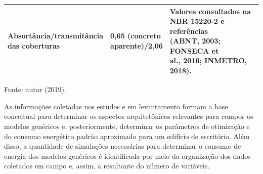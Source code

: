 \begin{table}[ht]
\begin{tabular*}{\columnwidth}{@{\extracolsep{\fill}}lll}
    \makecell[l]{Absortância/transmitância \\das coberturas}       & \makecell[l]{0,65 (concreto \\aparente)/2,06}                                         & \makecell[l]{Valores consultados na \\NBR 15220-2 e referências \\(ABNT, 2003; FONSECA et \\al., 2016; INMETRO, 2018).}                                                 \\ \hline
    \end{tabular*}
    \begin{flushleft}
        \par \small Fonte: autor (2019).
    \end{flushleft}
\end{table}\vspace*{-0.3cm}

\noindent As informações coletadas nos estudos e em levantamento formam a base conceitual para 
determinar os aspectos arquitetônicos relevantes para compor os modelos genéricos e, 
posteriormente, determinar os parâmetros de otimização e do consumo energético padrão 
aproximado para um edifício de escritório. Além disso, a quantidade de simulações necessárias 
para determinar o consumo de energia dos modelos genéricos é identificada por meio da 
organização dos dados coletados em campo e, assim, a resultante do número de variáveis.

